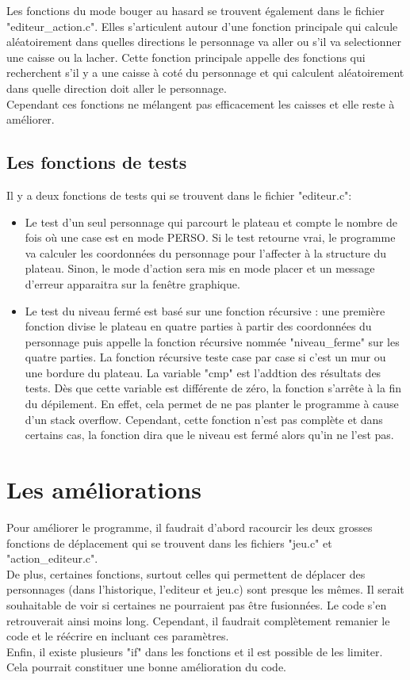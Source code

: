 \documentclass{report}
\begin{document}
Les fonctions du mode bouger au hasard se trouvent également dans le fichier "editeur\_action.c". Elles s'articulent autour d'une fonction principale qui calcule aléatoirement dans quelles directions le personnage va aller ou s'il va selectionner une caisse ou la lacher.
Cette fonction principale appelle des fonctions qui recherchent s'il y a une caisse à coté du personnage et qui calculent aléatoirement dans quelle direction doit aller le personnage.\\
Cependant ces fonctions ne mélangent pas efficacement les caisses et elle reste à améliorer.

		\section{Les fonctions de tests}
Il y a deux fonctions de tests qui se trouvent dans le fichier "editeur.c":\\
\begin{itemize}
\item Le test d'un seul personnage qui parcourt le plateau et compte le nombre de fois où une case est en mode PERSO. Si le test retourne vrai, le programme va calculer les coordonnées du personnage pour l'affecter à la structure du plateau.
Sinon, le mode d'action sera mis en mode placer et un message d'erreur apparaitra sur la fenêtre graphique.
\item Le test du niveau fermé est basé sur une fonction récursive : une première fonction divise le plateau en quatre parties à partir des coordonnées du personnage puis appelle la fonction récursive nommée "niveau\_ferme" sur les quatre parties.
La fonction récursive teste case par case si c'est un mur ou une bordure du plateau. La variable "cmp" est l'addtion des résultats des tests. Dès que cette variable est différente de zéro, la fonction s'arrête à la fin du dépilement.
En effet, cela permet de ne pas planter le programme à cause d'un stack overflow.
Cependant, cette fonction n'est pas complète et dans certains cas, la fonction dira que le niveau est fermé alors qu'in ne l'est pas.
\end{itemize}

	\chapter{Les améliorations}
Pour améliorer le programme, il faudrait d'abord racourcir les deux grosses fonctions de déplacement qui se trouvent dans les fichiers "jeu.c" et "action\_editeur.c".\\
De plus, certaines fonctions, surtout celles qui permettent de déplacer des personnages (dans l'historique, l'editeur et jeu.c) sont presque les mêmes. Il serait souhaitable de voir si certaines ne pourraient pas être fusionnées. Le code s'en retrouverait ainsi moins long.
Cependant, il faudrait complètement remanier le code et le réécrire en incluant ces paramètres.\\
Enfin, il existe plusieurs "if" dans les fonctions et il est possible de les limiter.
Cela pourrait constituer une bonne amélioration du code.
\end{document}
